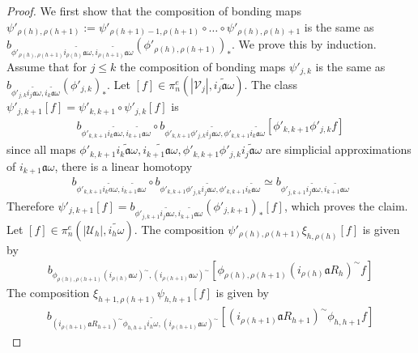 \documentclass[a4paper,11pt]{article}
\theoremstyle{definition}
\theoremstyle{plain}
\theoremstyle{remark}
\begin{document}
{\begin{proof}
We first show that the composition of bonding maps $\psi'_{\rho(h),\rho(h+1)}:= \psi'_{\rho(h+1)-1,\rho(h+1)}\circ \dots \circ  \psi'_{\rho(h),\rho(h)+1}$ is the same as $b_{ \phi'_{\rho(h),\rho(h+1)}\widetilde{i_{\rho(h)}\mathfrak{a}\omega}, \widetilde{i_{\rho(h+1)}\mathfrak{a}\omega}}(\phi'_{\rho(h),\rho(h+1)})_{*}$. We prove this by induction. Assume that for $j\leq k$ the composition of bonding maps $\psi'_{j,k}$ is the same as $b_{ \phi'_{j,k}\widetilde{i_{j}\mathfrak{a}\omega}, \widetilde{i_{k}\mathfrak{a}\omega}}(\phi'_{j,k})_{*}$. Let $[f]\in \pi^{e}_{n}(|\mathcal{V}_{j}|, \widetilde{i_{j}\mathfrak{a}\omega})$.  The class $\psi'_{j,k+1}[f] =  \psi'_{k,k+1} \circ \psi'_{j,k}[f]$ is 
\begin{align*}
b_{ \phi'_{k,k+1} \widetilde{i_{k}\mathfrak{a}\omega},\widetilde{i_{k+1}\mathfrak{a}\omega}} \circ b_{ \phi'_{k,k+1}\phi'_{j,k}\widetilde{i_{j}\mathfrak{a}\omega}, \phi'_{k,k+1} \widetilde{i_{k}\mathfrak{a}\omega}}[\phi'_{k,k+1}\phi'_{j,k}f]
\end{align*} since all maps $\phi'_{k,k+1} \widetilde{i_{k}\mathfrak{a}\omega}, \widetilde{i_{k+1}\mathfrak{a}\omega}, \phi'_{k,k+1}\phi'_{j,k}\widetilde{i_{j}\mathfrak{a}\omega}$ are simplicial approximations of $i_{k+1}\mathfrak{a}\omega$, there is a linear homotopy 
\begin{align*}
b_{ \phi'_{k,k+1} \widetilde{i_{k}a\omega},\widetilde{i_{k+1}\mathfrak{a}\omega}} \circ b_{ \phi'_{k,k+1}\phi'_{j,k}\widetilde{i_{j}\mathfrak{a}\omega}, \phi'_{k,k+1} \widetilde{i_{k}\mathfrak{a}\omega}}\simeq  b_{ \phi'_{j,k+1} \widetilde{i_{j}\mathfrak{a}\omega},\widetilde{i_{k+1}\mathfrak{a}\omega}}
\end{align*}
Therefore $\psi'_{j,k+1}[f] = b_{ \phi'_{j,k+1}\widetilde{i_{j}\mathfrak{a}\omega}, \widetilde{i_{k+1}\mathfrak{a}\omega}}(\phi'_{j,k+1})_{*}[f]$, which proves the claim. \\

Let $[f]\in \pi_{n}^{e}(|\mathcal{U}_{h}|,\widetilde{i_{h}\omega})$. The composition $\psi'_{\rho(h),\rho(h+1)}\xi_{h,\rho(h)}[f]$ is given by 
\begin{align*}
b_{\phi_{\rho(h), \rho(h+1)} (i_{\rho(h)}\mathfrak{a}\omega)^{\sim}, (i_{\rho(h+1)}\mathfrak{a}\omega)^{\sim}}[\phi_{\rho(h), \rho(h+1)}(i_{\rho(h)}\mathfrak{a}R_{h})^{\sim}f]
\end{align*}
The composition $\xi_{h+1,\rho(h+1)}\psi_{h,h+1}[f]$ is given by 
\begin{align*}
b_{(i_{\rho(h+1)}\mathfrak{a}R_{h+1})^{\sim}\phi_{h,h+1}\widetilde{i_{h}\omega},(i_{\rho(h+1)}\mathfrak{a}\omega)^{\sim}}[(i_{\rho(h+1)}\mathfrak{a}R_{h+1})^{\sim}\phi_{h,h+1}f]
\end{align*}


\end{proof}}
\end{document}
